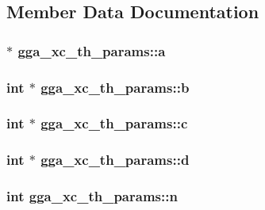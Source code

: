 \subsection{Member Data Documentation}
\hypertarget{structgga__xc__th__params_a6bb933b49bf8088cced4935f5629fe7b}{
\subsubsection[{a}]{$\ast$ gga\-\_\-xc\-\_\-th\-\_\-params\-::a}}\label{structgga__xc__th__params_a6bb933b49bf8088cced4935f5629fe7b}
\hypertarget{structgga__xc__th__params_a12f43f2179bd8ff9dd80eddd295237cd}{
\subsubsection[{b}]{\setlength{\rightskip}{0pt plus 5cm}int $\ast$ gga\-\_\-xc\-\_\-th\-\_\-params\-::b}}\label{structgga__xc__th__params_a12f43f2179bd8ff9dd80eddd295237cd}
\hypertarget{structgga__xc__th__params_a8c97b807c9aa8ff1685bee0fb9c313f7}{
\subsubsection[{c}]{\setlength{\rightskip}{0pt plus 5cm}int $\ast$ gga\-\_\-xc\-\_\-th\-\_\-params\-::c}}\label{structgga__xc__th__params_a8c97b807c9aa8ff1685bee0fb9c313f7}
\hypertarget{structgga__xc__th__params_ab6243532620dedbdf9dd1feaf9dd03e7}{
\subsubsection[{d}]{\setlength{\rightskip}{0pt plus 5cm}int $\ast$ gga\-\_\-xc\-\_\-th\-\_\-params\-::d}}\label{structgga__xc__th__params_ab6243532620dedbdf9dd1feaf9dd03e7}
\hypertarget{structgga__xc__th__params_aec0dfdff952f4593c8976b21c3a8c75d}{
\subsubsection[{n}]{\setlength{\rightskip}{0pt plus 5cm}int gga\-\_\-xc\-\_\-th\-\_\-params\-::n}}\label{structgga__xc__th__params_aec0dfdff952f4593c8976b21c3a8c75d}
